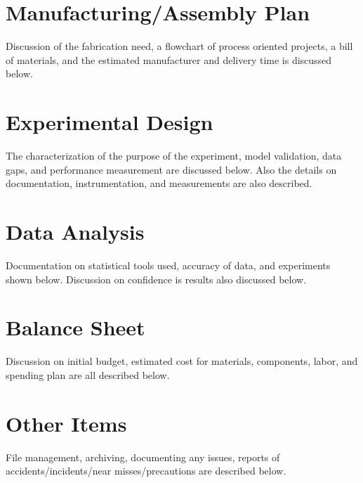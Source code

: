 \documentclass[12pt]{article}
\begin{document}
	\newpage
	
	\section{Manufacturing/Assembly Plan}
	Discussion of the fabrication need, a flowchart of process oriented projects, a bill of materials, and the estimated manufacturer and delivery time is discussed below.
	
	\newpage
	
	\section{Experimental Design}
	The characterization of the purpose of the experiment, model validation, data gaps, and performance measurement are discussed below. Also the details on documentation, instrumentation, and measurements are also described.
		
	\newpage	
	
	\section{Data Analysis}
	Documentation on statistical tools used, accuracy of data, and experiments shown below. Discussion on confidence is results also discussed below.
		
	\newpage
	
	\section{Balance Sheet}
	Discussion on initial budget, estimated cost for materials, components, labor, and spending plan are all described below.
		
	\newpage				
						
	\section{Other Items}
	File management, archiving, documenting any issues, reports of accidents/incidents/near misses/precautions are described below.
\end{document}
